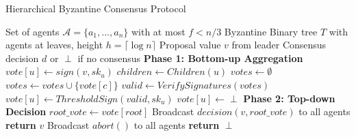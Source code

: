 
\begin{algorithm}[htbp]
\caption{Hierarchical Byzantine Consensus Protocol}
\label{alg:hierarchical_consensus}
\begin{algorithmic}[1]
\REQUIRE Set of agents $\mathcal{A} = \{a_1, ..., a_n\}$ with at most $f < n/3$ Byzantine
\REQUIRE Binary tree $T$ with agents at leaves, height $h = \lceil \log n \rceil$
\REQUIRE Proposal value $v$ from leader
\ENSURE Consensus decision $d$ or $\perp$ if no consensus
\STATE \textbf{Phase 1: Bottom-up Aggregation}
            \STATE $vote[u] \gets sign(v, sk_u)$ 
        \ELSE
            \STATE $children \gets Children(u)$
            \STATE $votes \gets \emptyset$
                \STATE $votes \gets votes \cup \{vote[c]\}$
            \ENDFOR
            \STATE $valid \gets VerifySignatures(votes)$
                \STATE $vote[u] \gets ThresholdSign(valid, sk_u)$
            \ELSE
                \STATE $vote[u] \gets \perp$ 
            \ENDIF
        \ENDIF
    \ENDFOR
\ENDFOR
\STATE \textbf{Phase 2: Top-down Decision}
\STATE $root\_vote \gets vote[root]$
    \STATE Broadcast $decision(v, root\_vote)$ to all agents
    \STATE \textbf{return} $v$
\ELSE
    \STATE Broadcast $abort()$ to all agents
    \STATE \textbf{return} $\perp$
\ENDIF
\end{algorithmic}
\end{algorithm}

